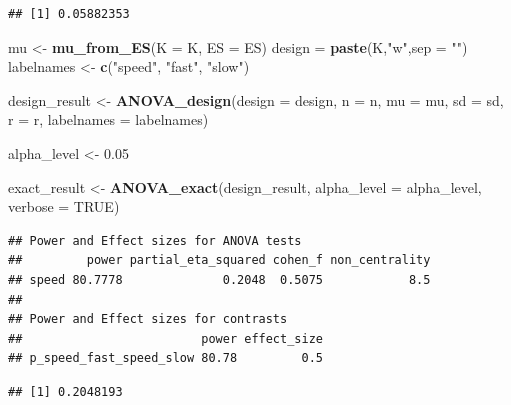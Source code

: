 \documentclass[]{book}
\newenvironment{Shaded}{\begin{snugshade}}{\end{snugshade}}
\newcommand{\DataTypeTok}[1]{\textcolor[rgb]{0.13,0.29,0.53}{#1}}
\newcommand{\FloatTok}[1]{\textcolor[rgb]{0.00,0.00,0.81}{#1}}
\newcommand{\KeywordTok}[1]{\textcolor[rgb]{0.13,0.29,0.53}{\textbf{#1}}}
\newcommand{\NormalTok}[1]{#1}
\newcommand{\OperatorTok}[1]{\textcolor[rgb]{0.81,0.36,0.00}{\textbf{#1}}}
\newcommand{\OtherTok}[1]{\textcolor[rgb]{0.56,0.35,0.01}{#1}}
\newcommand{\StringTok}[1]{\textcolor[rgb]{0.31,0.60,0.02}{#1}}
\begin{document}
\begin{verbatim}
## [1] 0.05882353
\end{verbatim}

\begin{Shaded}
\begin{Highlighting}[]
\NormalTok{mu <-}\StringTok{ }\KeywordTok{mu_from_ES}\NormalTok{(}\DataTypeTok{K =}\NormalTok{ K, }\DataTypeTok{ES =}\NormalTok{ ES)}
\NormalTok{design =}\StringTok{ }\KeywordTok{paste}\NormalTok{(K,}\StringTok{"w"}\NormalTok{,}\DataTypeTok{sep =} \StringTok{""}\NormalTok{)}
\NormalTok{labelnames <-}\StringTok{ }\KeywordTok{c}\NormalTok{(}\StringTok{"speed"}\NormalTok{, }\StringTok{"fast"}\NormalTok{, }\StringTok{"slow"}\NormalTok{)}

\NormalTok{design_result <-}\StringTok{ }\KeywordTok{ANOVA_design}\NormalTok{(}\DataTypeTok{design =}\NormalTok{ design,}
                   \DataTypeTok{n =}\NormalTok{ n, }
                   \DataTypeTok{mu =}\NormalTok{ mu, }
                   \DataTypeTok{sd =}\NormalTok{ sd, }
                   \DataTypeTok{r =}\NormalTok{ r, }
                   \DataTypeTok{labelnames =}\NormalTok{ labelnames)}

\NormalTok{alpha_level <-}\StringTok{ }\FloatTok{0.05}

\NormalTok{exact_result <-}\StringTok{ }\KeywordTok{ANOVA_exact}\NormalTok{(design_result,}
                            \DataTypeTok{alpha_level =}\NormalTok{ alpha_level,}
                            \DataTypeTok{verbose =} \OtherTok{TRUE}\NormalTok{)}
\end{Highlighting}
\end{Shaded}

\begin{verbatim}
## Power and Effect sizes for ANOVA tests
##         power partial_eta_squared cohen_f non_centrality
## speed 80.7778              0.2048  0.5075            8.5
## 
## Power and Effect sizes for contrasts
##                         power effect_size
## p_speed_fast_speed_slow 80.78         0.5
\end{verbatim}

\begin{Shaded}
\end{Shaded}

\begin{verbatim}
## [1] 0.2048193
\end{verbatim}
\end{document}
